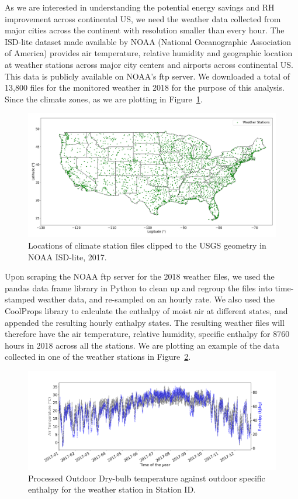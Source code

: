 As we are interested in understanding the potential energy savings and RH improvement across continental US, we need the weather data collected from major cities across the continent with resolution smaller than every hour. The ISD-lite dataset made available by NOAA (National Oceanographic Association of America) provides air temperature, relative humidity and geographic location at weather stations across major city centers and airports across continental US. This data is publicly available on NOAA’s ftp server. We downloaded a total of 13,800 files for the monitored weather in 2018 for the purpose of this analysis. Since the climate zones, as we are plotting in Figure~\ref{fg:stations}. 

\begin{figure}[h!]
\centering
\includegraphics[width=\textwidth]{stations.png}
\caption{Locations of climate station files clipped to the USGS geometry in NOAA ISD-lite, 2017.}\label{fg:stations}
\end{figure}

Upon scraping the NOAA ftp server for the 2018 weather files, we used the pandas data frame library in Python to clean up and regroup the files into time-stamped weather data, and re-sampled on an hourly rate. We also used the CoolProps library to calculate the enthalpy of moist air at different states, and appended the resulting hourly enthalpy states. The resulting weather files will therefore have the air temperature, relative humidity, specific enthalpy for 8760 hours in 2018 across all the stations. We are plotting an example of the data collected in one of the weather stations in Figure~\ref{fg:sampleh}.


\begin{figure}
\centering
\includegraphics[width=\textwidth]{tbd_h.png}
\caption{ Processed Outdoor Dry-bulb temperature against outdoor specific enthalpy for the weather station in Station ID.}\label{fg:sampleh}
\end{figure}

